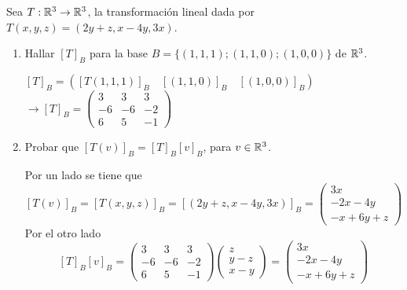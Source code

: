 \item Sea $T:\mathbb{R}^3\to\mathbb{R}^3$, la transformación lineal dada por $T(x,y,z)=(2y+z,x-4y,3x)$.
    \begin{enumerate}
        \item Hallar $[T]_B$ para la base $B=\{(1,1,1);(1,1,0);(1,0,0)\}$ de $\mathbb{R}^3$.
            \begin{mdframed}[style=s]
                \begin{center}
                    $[T]_B=\left([T(1,1,1)]_B\quad[(1,1,0)]_B\quad[(1,0,0)]_B\right)$\\
                    $\to [T]_B=\begin{pmatrix}
                        3&3&3\\-6&-6&-2\\6&5&-1
                    \end{pmatrix}$
                \end{center}
            \end{mdframed}
        \item Probar que $[T(v)]_B=[T]_B[v]_B$, para $v\in\mathbb{R}^3$.
            \begin{mdframed}[style=s]
                Por un lado se tiene que
                \[[T(v)]_B=[T(x,y,z)]_B=[(2y+z,x-4y,3x)]_B=\begin{pmatrix}
                    3x\\-2x-4y\\-x+6y+z
                \end{pmatrix}\]
                Por el otro lado
                \[[T]_B[v]_B=\begin{pmatrix}
                    3&3&3\\-6&-6&-2\\6&5&-1
                \end{pmatrix}\begin{pmatrix}
                    z\\y-z\\x-y
                \end{pmatrix}=\begin{pmatrix}
                    3x\\-2x-4y\\-x+6y+z
                \end{pmatrix}\]
            \end{mdframed}
    \end{enumerate}